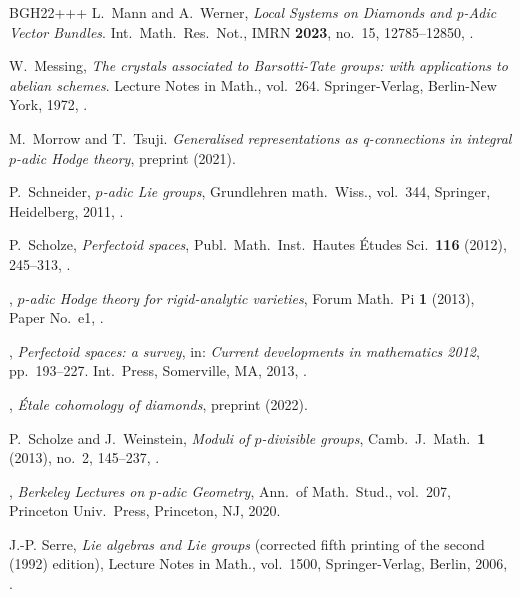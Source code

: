 \documentclass[11pt]{amsart}
\numberwithin{equation}{section}
\theoremstyle{definition}
\theoremstyle{remark}
\begin{document}
\begin{thebibliography}{BGH{\etalchar{+}}22+++}
L.~Mann and  A.~Werner, 
{\em {L}ocal {S}ystems on {D}iamonds and p-{A}dic {V}ector {B}undles}.  Int.\ Math.\ Res.\ Not., IMRN \textbf{2023}, no.~15, 12785--12850, .

W.~Messing, 
{\em {T}he crystals associated to {B}arsotti-{T}ate groups: with applications to abelian schemes}.  Lecture Notes in Math., vol.~264. Springer-Verlag, Berlin-New York, 1972, .
	
M.~Morrow and T.~Tsuji.
{\em Generalised representations as q-connections in integral $p$-adic {H}odge theory}, preprint  (2021).
		
P.~Schneider, 
{\em {$p$}-adic {L}ie groups}, Grundlehren math.\ Wiss., vol.~344, Springer, Heidelberg, 2011, .
	
P.~Scholze, 
{\em {P}erfectoid spaces}, Publ.\ Math.\ Inst.\ Hautes \'{E}tudes Sci.\ \textbf{116} (2012), 245--313, .
	
\bysame, 
       {\em {$p$}-adic {H}odge theory for rigid-analytic varieties}, Forum Math.\ Pi \textbf{1} (2013), Paper No.~e1,  .
	
\bysame, 
{\em {P}erfectoid spaces: a survey}, in: {\em Current developments in mathematics 2012}, pp.~193--227.  Int.\ Press, Somerville, MA, 2013, .
	
\bysame, 
{\em {\'E}tale cohomology of diamonds}, preprint  (2022).

P.~Scholze and  J.~Weinstein, 
{\em {M}oduli of {$p$}-divisible groups}, Camb.\ J.~Math.\ \textbf{1} (2013), no.~2, 145--237, .
	
\bysame, 
{\em {B}erkeley {L}ectures on $p$-adic {G}eometry}, Ann.\ of Math.\ Stud., vol.~207, Princeton Univ.\ Press, Princeton, NJ, 2020.
       
J.-P. Serre, 
{\em Lie algebras and {L}ie groups} (corrected fifth printing of the second (1992) edition), Lecture Notes in Math., vol.~1500, Springer-Verlag, Berlin, 2006, .


\end{thebibliography}
\end{document}
